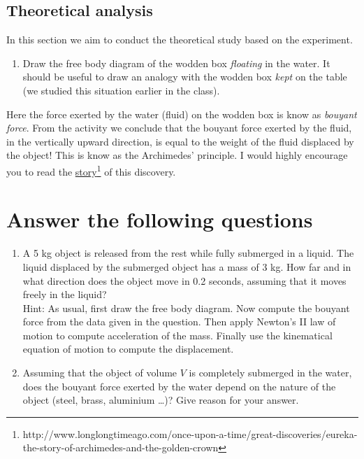 \documentclass[10pt]{article}
\begin{document}
\subsection{Theoretical analysis}
In this section we aim to conduct the theoretical study based on the experiment.
\begin{enumerate}
\item Draw the free body diagram of the wodden box \emph{floating} in the water.  It should be useful to draw an analogy with the wodden box \emph{kept} on the table (we studied this situation earlier in the class). 
\vspace{250px}
\end{enumerate}
Here the force exerted by the water (fluid) on the wodden box is know as \emph{bouyant force}.  From the activity we conclude that the bouyant force exerted by the fluid, in the vertically upward direction, is equal to the weight of the fluid displaced by the object!  This is know as the Archimedes' principle.  I would highly encourage you to read the \href{http://www.longlongtimeago.com/once-upon-a-time/great-discoveries/eureka-the-story-of-archimedes-and-the-golden-crown/}{story}\footnote{http://www.longlongtimeago.com/once-upon-a-time/great-discoveries/eureka-the-story-of-archimedes-and-the-golden-crown} of this discovery. 

\section{Answer the following questions}
\begin{enumerate}
\item A 5 kg object is released from the rest while fully submerged in a liquid.  The liquid displaced by the submerged object has a mass of 3 kg.  How far and in what direction does the object move in 0.2 seconds, assuming that it moves freely in the liquid?\\
Hint: As usual, first draw the free body diagram.  Now compute the bouyant force from the data given in the question.  Then apply Newton's II law of motion to compute acceleration of the mass.  Finally use the kinematical equation of motion to compute the displacement.
\vspace{250px}
\item Assuming that the object of volume $V$ is completely submerged in the water, does the bouyant force exerted by the water depend on the nature of the object (steel, brass, aluminium \ldots)?  Give reason for your answer.
\end{enumerate}
\end{document}
